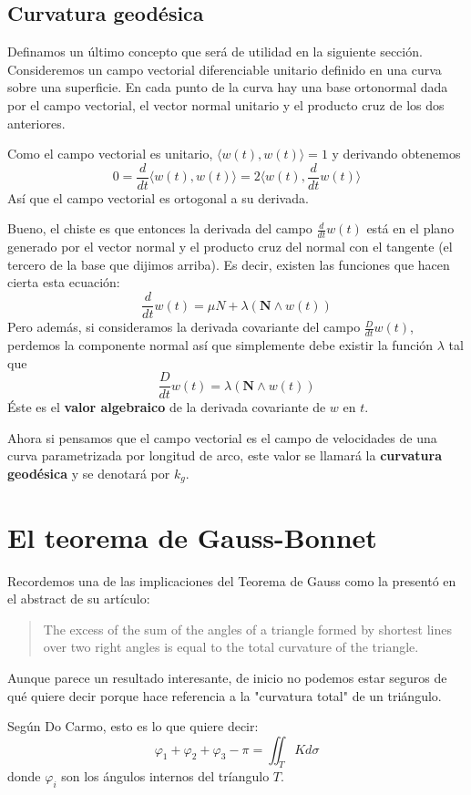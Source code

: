 \documentclass[spanish]{book}
\theoremstyle{definition}
\begin{document}
\subsection{Curvatura geodésica}
Definamos un último concepto que será de utilidad en la siguiente sección. Consideremos un campo vectorial diferenciable unitario definido en una curva sobre una superficie. En cada punto de la curva hay una base ortonormal dada por el campo vectorial, el vector normal unitario y el producto cruz de los dos anteriores.

Como el campo vectorial es unitario, $\langle w(t),w(t)\rangle=1$ y derivando obtenemos
\[0=\frac{d}{dt}\langle w(t),w(t)\rangle=2\langle w(t),\frac{d}{dt}w(t)\rangle\]
Así que el campo vectorial es ortogonal a su derivada.

Bueno, el chiste es que entonces la derivada del campo $\frac{d}{dt}w(t)$ está en el plano generado por el vector normal y el producto cruz del normal con el tangente (el tercero de la base que dijimos arriba). Es decir, existen las funciones que hacen cierta esta ecuación:
\[\frac{d}{dt}w(t)=\mu N+\lambda\left(\mathbf N\wedge w(t)\right)\]
Pero además, si consideramos la derivada covariante del campo $\frac{D}{dt}w(t)$, perdemos la componente normal así que simplemente debe existir la función $\lambda$ tal que
\[\frac{D}{dt}w(t)=\lambda\left(\mathbf{N}\wedge w(t)\right)\]
Éste es el \textbf{valor algebraico} de la derivada covariante de $w$ en $t$.

Ahora si pensamos que el campo vectorial es el campo de velocidades de una curva parametrizada por longitud de arco, este valor se llamará la \textbf{curvatura geodésica} y se denotará por $k_g$.

\section{El teorema de Gauss-Bonnet}
Recordemos una de las implicaciones del Teorema de Gauss como la presentó en el abstract de su artículo:
\begin{quotation}
	The excess of the sum of the angles of a triangle formed by shortest lines over two right angles is equal to the total curvature of the triangle.
\end{quotation}
Aunque parece un resultado interesante, de inicio no podemos estar seguros de qué quiere decir porque hace referencia a la "curvatura total" de un triángulo.

Según Do Carmo, esto es lo que quiere decir:
\[\varphi_1+\varphi_2+\varphi_3-\pi=\iint_TKd\sigma\]
donde $\varphi_i$ son los ángulos internos del tríangulo $T$.
\end{document}
